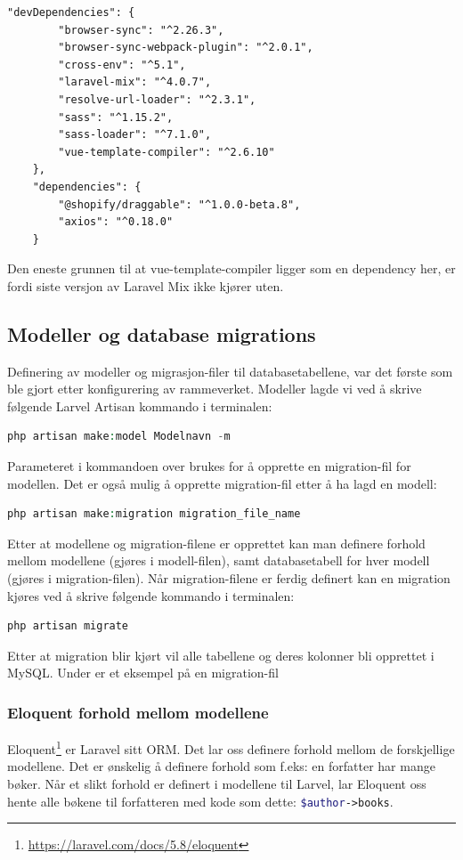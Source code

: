 \begin{lstlisting}[caption={Siste package.json}]
    "devDependencies": {
        "browser-sync": "^2.26.3",
        "browser-sync-webpack-plugin": "^2.0.1",
        "cross-env": "^5.1",
        "laravel-mix": "^4.0.7",
        "resolve-url-loader": "^2.3.1",
        "sass": "^1.15.2",
        "sass-loader": "^7.1.0",
        "vue-template-compiler": "^2.6.10"
    },
    "dependencies": {
        "@shopify/draggable": "^1.0.0-beta.8",
        "axios": "^0.18.0"
    }
\end{lstlisting}
Den eneste grunnen til at vue-template-compiler ligger som en dependency her, er fordi siste versjon av Laravel Mix ikke kjører uten.

\subsection{Modeller og database migrations}
Definering av modeller og migrasjon-filer til databasetabellene, var det første som ble gjort etter konfigurering av rammeverket.
Modeller lagde vi ved å skrive følgende Larvel Artisan kommando i terminalen:
\begin{lstlisting}[caption={Laravel Artisan kommando for oppretting av modell og migration},language=php]
    php artisan make:model Modelnavn -m
\end{lstlisting}
Parameteret  i kommandoen over brukes for å opprette en migration-fil for modellen. Det er også mulig å opprette migration-fil etter å ha lagd en modell:
\begin{lstlisting}[caption={Laravel Artisan kommando for oppretting av migration-fil},language=php]
    php artisan make:migration migration_file_name
\end{lstlisting}
Etter at modellene og migration-filene er opprettet kan man definere forhold mellom modellene (gjøres i modell-filen), samt databasetabell for hver modell (gjøres i migration-filen).
Når migration-filene er ferdig definert kan en migration kjøres ved å skrive følgende kommando i terminalen:
\begin{lstlisting}[caption={Laravel Artisan kommando for å kjøre migration},language=php]
    php artisan migrate
\end{lstlisting}
Etter at migration blir kjørt vil alle tabellene og deres kolonner bli opprettet i MySQL.
Under er et eksempel på en migration-fil


\subsubsection{Eloquent forhold mellom modellene}
Eloquent\footnote{\url{https://laravel.com/docs/5.8/eloquent}} er Laravel sitt ORM. Det lar oss definere forhold mellom de forskjellige modellene. Det er ønskelig å definere forhold som f.eks: en forfatter har mange bøker. Når et slikt forhold er definert i modellene til Larvel, lar Eloquent oss hente alle bøkene til forfatteren med kode som dette: \lstinline[language=PHP]{$author->books}.

